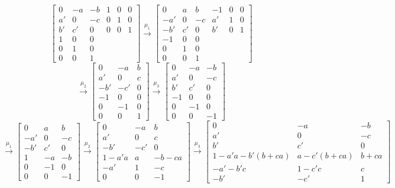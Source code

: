 \documentclass{amsart}
\numberwithin{theorem}{section}
\begin{document}
  \[
    \left[\begin{array}{cccccc}
      0 & -a & -b & 1 & 0 & 0\\
      a' & 0 & -c & 0 & 1 & 0\\
      b' & c' & 0 & 0 & 0 & 1\\
      1 & 0 & 0\\ 0 & 1 & 0\\ 0 & 0 & 1
    \end{array}\right]
    \stackrel{\mu_1}{\longrightarrow}
    \left[\begin{array}{cccccc}
         0 & a & b & -1 & 0 & 0\\
      -a' & 0 & -c & a' & 1 & 0\\
      -b' & c' & 0 & b' & 0 & 1\\
      -1 & 0 & 0\\ 0 & 1 & 0\\ 0 & 0 & 1
    \end{array}\right]
  \]
  \[
    \stackrel{\mu_2}{\longrightarrow}\left[\begin{array}{ccc} 0 & -a & b\\ a' & 0 & c\\ -b' & -c' & 0\\ -1 & 0 & 0\\ 0 & -1 & 0\\ 0 & 0 & 1\end{array}\right]
    \stackrel{\mu_3}{\longrightarrow}\left[\begin{array}{ccc} 0 & -a & -b\\ a' & 0 & -c\\ b' & c' & 0\\ -1 & 0 & 0\\ 0 & -1 & 0\\ 0 & 0 & -1\end{array}\right]
  \]
  \[
    \stackrel{\mu_1}{\longrightarrow}\left[\begin{array}{ccc} 0 & a & b\\ -a' & 0 & -c\\ -b' & c' & 0\\ 1 & -a & -b\\ 0 & -1 & 0\\ 0 & 0 & -1\end{array}\right]
    \stackrel{\mu_2}{\longrightarrow}\left[\begin{array}{ccc} 0 & -a & b\\ a' & 0 & c\\ -b' & -c' & 0\\ 1-a'a & a & -b-ca\\ -a' & 1 & -c\\ 0 & 0 & -1\end{array}\right]
    \stackrel{\mu_3}{\longrightarrow}\left[\begin{array}{ccc} 0 & -a & -b\\ a' & 0 & -c\\ b' & c' & 0\\ 1-a'a-b'(b+ca) & a-c'(b+ca) & b+ca\\ -a'-b'c & 1-c'c & c\\ -b' & -c' & 1\end{array}\right]
  \]
\end{document}
